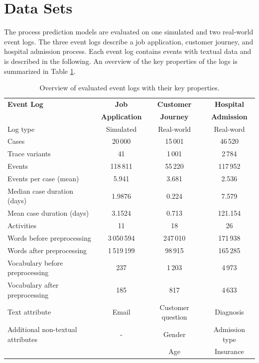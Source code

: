 \section{Data Sets}\label{sec:datasets}

The process prediction models are evaluated on one simulated and two real-world event logs.
The three event logs describe a job application, customer journey, and hospital admission process.
Each event log contains events with textual data and is described in the following.
An overview of the key properties of the logs is summarized in Table \ref{tab:logs}.

\begin{table}[!htbp]
	\setlength\tabcolsep{5pt}
	\begin{tabularx}{\textwidth}{l c c c}
		\toprule
		\textbf{Event Log} & \textbf{Job} & \textbf{Customer} & \textbf{Hospital}  \\
		& \textbf{Application} & \textbf{Journey} &\textbf{Admission}  \\
		\midrule
		Log type & Simulated & Real-world & Real-word\\
		Cases & 20\,000& 15\,001& 46\,520\\
		Trace variants &41 & 1\,001 &2\,784 \\
		Events & 118\,811 & 55\,220 & 117\,952\\
		Events per case (mean) & 5.941& 3.681& 2.536\\
		Median case duration (days) & 1.9876 & 0.224& 7.579\\
		Mean case duration (days)& 3.1524 &  0.713 & 121.154\\
		Activities & 11 & 18 & 26\\
		Words before preprocessing & 3\,050\,594 &247\,010 &  171\,938\\
		Words after preprocessing  &1\,519\,199 &98\,915 & 165\,285\\
		Vocabulary before preprocessing & 237 & 1\,203 & 4\,973 \\
		Vocabulary after preprocessing & 185 & 817 & 4\,633\\
		Text attribute & Email& Customer question & Diagnosis\\
		Additional non-textual attributes & - & Gender& Admission type\\
		&  & Age& Insurance\\
		\bottomrule
	\end{tabularx}
	\caption[Overview of evaluated event logs]{Overview of evaluated event logs with their key properties.}
	\label{tab:logs}
\end{table}

